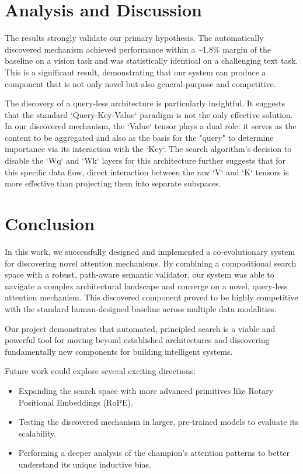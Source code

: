 \documentclass[11pt, a4paper]{article}
\begin{document}
\section{Analysis and Discussion}
The results strongly validate our primary hypothesis. The automatically discovered mechanism achieved performance within a \textasciitilde1.8\% margin of the baseline on a vision task and was statistically identical on a challenging text task. This is a significant result, demonstrating that our system can produce a component that is not only novel but also general-purpose and competitive.

The discovery of a query-less architecture is particularly insightful. It suggests that the standard `Query-Key-Value` paradigm is not the only effective solution. In our discovered mechanism, the `Value` tensor plays a dual role: it serves as the content to be aggregated and also as the basis for the "query" to determine importance via its interaction with the `Key`. The search algorithm's decision to disable the `Wq` and `Wk` layers for this architecture further suggests that for this specific data flow, direct interaction between the raw `V` and `K` tensors is more effective than projecting them into separate subspaces.

\section{Conclusion}
In this work, we successfully designed and implemented a co-evolutionary system for discovering novel attention mechanisms. By combining a compositional search space with a robust, path-aware semantic validator, our system was able to navigate a complex architectural landscape and converge on a novel, query-less attention mechanism. This discovered component proved to be highly competitive with the standard human-designed baseline across multiple data modalities.

Our project demonstrates that automated, principled search is a viable and powerful tool for moving beyond established architectures and discovering fundamentally new components for building intelligent systems.

Future work could explore several exciting directions:
\begin{itemize}
    \item Expanding the search space with more advanced primitives like Rotary Positional Embeddings (RoPE).
    \item Testing the discovered mechanism in larger, pre-trained models to evaluate its scalability.
    \item Performing a deeper analysis of the champion's attention patterns to better understand its unique inductive bias.
\end{itemize}
\end{document}
